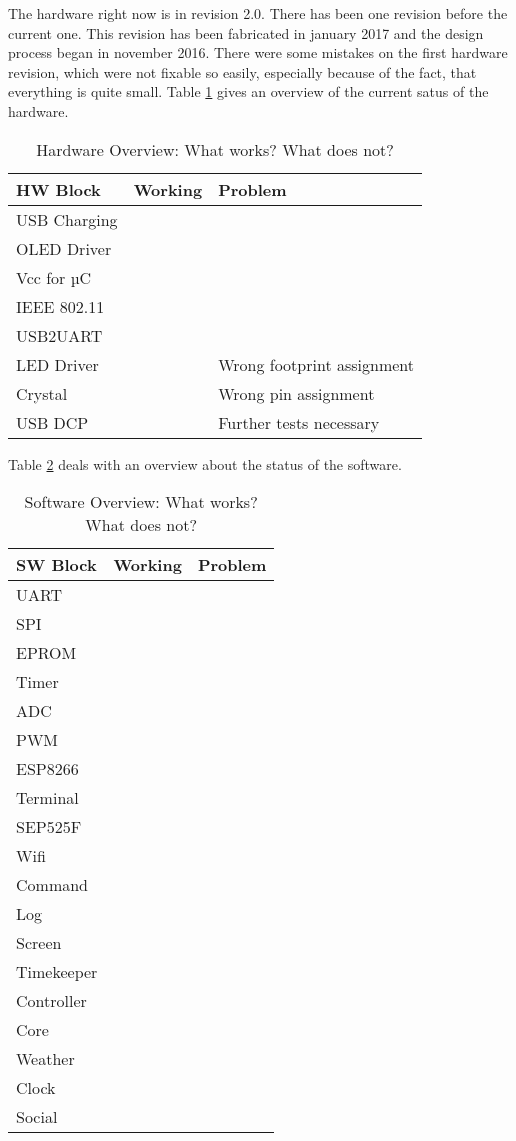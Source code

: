 The hardware right now is in revision 2.0. There has been one revision before the current one. This revision has been fabricated in january 2017 and the design process began in november 2016. There were some mistakes on the first hardware revision, which were not fixable so easily, especially because of the fact, that everything is quite small. Table \ref{tab:hw} gives an overview of the current satus of the hardware.   
\begin{table}[H]
\centering
\begin{tabular}{lll}
\textbf{HW Block}  	& \textbf{Working}& \textbf{Problem}  	\\\hline
USB Charging 	& \checkmark	& 				\\
OLED Driver  	& \checkmark    & 				\\
Vcc for µC   	& \checkmark    & 				\\
IEEE 802.11   	& \checkmark    &                             	\\
USB2UART	& \checkmark	&				\\
LED Driver	&		& Wrong footprint assignment	\\
Crystal		&		& Wrong pin assignment		\\
USB DCP		&		& Further tests necessary	\\
\end{tabular}
\caption{Hardware Overview: What works? What does not?}
\label{tab:hw}
\end{table}
Table \ref{tab:sw} deals with an overview about the status of the software. 
\begin{table}[H]
\centering
\begin{tabular}{lll}
\textbf{SW Block}  	& \textbf{Working}& \textbf{Problem} 	\\\hline
UART 		& \checkmark	& 				\\
SPI	  	& \checkmark    & 				\\
EPROM   	& \checkmark    & 				\\
Timer   	& \checkmark    &                             	\\
ADC		& 		& 				\\
PWM 		&		&				\\
ESP8266		& \checkmark	& 				\\
Terminal	& \checkmark	& 				\\
SEP525F		& \checkmark	& 				\\
Wifi		& 		& 				\\
Command		& \checkmark	& 				\\
Log		& \checkmark	& 				\\
Screen		& \checkmark	& 				\\
Timekeeper	& \checkmark	& 				\\
Controller	&		&				\\
Core		& \checkmark	& 				\\
Weather		& \checkmark	&				\\
Clock		& \checkmark	&				\\
Social		& 		&				\\
\end{tabular}
\caption{Software Overview: What works? What does not?}
\label{tab:sw}
\end{table}
